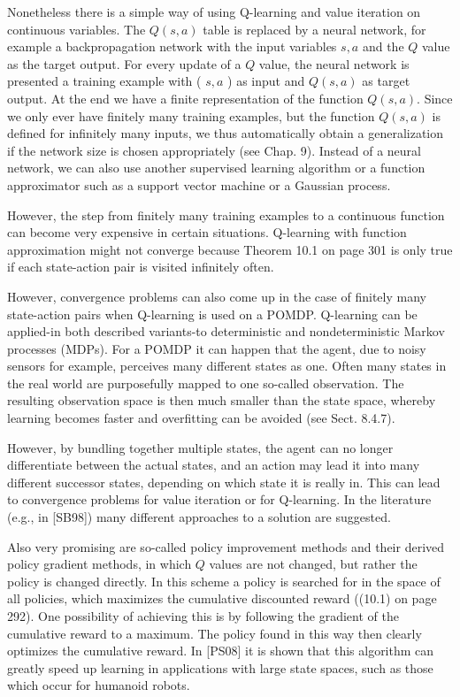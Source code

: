 \documentclass[10pt]{article}
\begin{document}
Nonetheless there is a simple way of using Q-learning and value iteration on continuous variables. The $Q(s, a)$ table is replaced by a neural network, for example a backpropagation network with the input variables $s, a$ and the $Q$ value as the target output. For every update of a $Q$ value, the neural network is presented a training example with ( $s, a$ ) as input and $Q(s, a)$ as target output. At the end we have a finite representation of the function $Q(s, a)$. Since we only ever have finitely many training examples, but the function $Q(s, a)$ is defined for infinitely many inputs, we thus automatically obtain a generalization if the network size is chosen appropriately (see Chap. 9). Instead of a neural network, we can also use another supervised learning algorithm or a function approximator such as a support vector machine or a Gaussian process.

However, the step from finitely many training examples to a continuous function can become very expensive in certain situations. Q-learning with function approximation might not converge because Theorem 10.1 on page 301 is only true if each state-action pair is visited infinitely often.

However, convergence problems can also come up in the case of finitely many state-action pairs when Q-learning is used on a POMDP. Q-learning can be applied-in both described variants-to deterministic and nondeterministic Markov processes (MDPs). For a POMDP it can happen that the agent, due to noisy sensors for example, perceives many different states as one. Often many states in the real world are purposefully mapped to one so-called observation. The resulting observation space is then much smaller than the state space, whereby learning becomes faster and overfitting can be avoided (see Sect. 8.4.7).

However, by bundling together multiple states, the agent can no longer differentiate between the actual states, and an action may lead it into many different successor states, depending on which state it is really in. This can lead to convergence problems for value iteration or for Q-learning. In the literature (e.g., in [SB98]) many different approaches to a solution are suggested.

Also very promising are so-called policy improvement methods and their derived policy gradient methods, in which $Q$ values are not changed, but rather the policy is changed directly. In this scheme a policy is searched for in the space of all policies, which maximizes the cumulative discounted reward ((10.1) on page 292). One possibility of achieving this is by following the gradient of the cumulative reward to a maximum. The policy found in this way then clearly optimizes the cumulative reward. In [PS08] it is shown that this algorithm can greatly speed up learning in applications with large state spaces, such as those which occur for humanoid robots.
\end{document}
